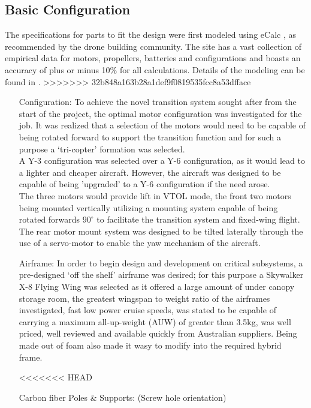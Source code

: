 \subsection{Basic Configuration}
The specifications for parts to fit the design were first modeled using eCalc , as recommended by the drone building community. The site has a vast collection of empirical data for motors, propellers, batteries and configurations and boasts an accuracy of plus or minus 10\% for all calculations. Details of the modeling can be found in .
>>>>>>> 32b848a163b28a1def9f0819535fcc8a53dfface
	 \begin{itemize}
		\item[Configuration:] 	To achieve the novel transition system sought after from the start of the project, the optimal motor configuration was investigated for the job. It was realized that a selection of the motors would need to be capable of being rotated forward to support the transition function and for such a purpose a `tri-copter' formation was selected.\\
		A Y-3 configuration was selected over a Y-6 configuration, as it would lead to a lighter and cheaper aircraft. However, the aircraft was designed to be capable of being 'upgraded' to a Y-6 configuration if the need arose.\\
		The three motors would provide lift in VTOL mode, the front two motors being mounted vertically utilizing a mounting system capable of being rotated forwards $90^{\circ}$ to facilitate the transition system and fixed-wing flight. The rear motor mount system was designed to be tilted laterally through the use of a servo-motor to enable the yaw mechanism of the aircraft.\\
	
		\item[Airframe:] 	In order to begin design and development on critical subsystems, a pre-designed `off the shelf' airframe was desired; for this purpose a Skywalker X-8 Flying Wing was selected as it offered a large amount of under canopy storage room, the greatest wingspan to weight ratio of the airframes investigated, fast low power cruise speeds, was stated to be capable of carrying a maximum all-up-weight (AUW) of greater than 3.5kg, was well priced, well reviewed and available quickly from Australian suppliers. Being made out of foam also made it wasy to modify into the required hybrid frame.
		
<<<<<<< HEAD
		\item[Carbon fiber Poles \& Supports:] (Screw hole orientation)
		

\end{itemize}
